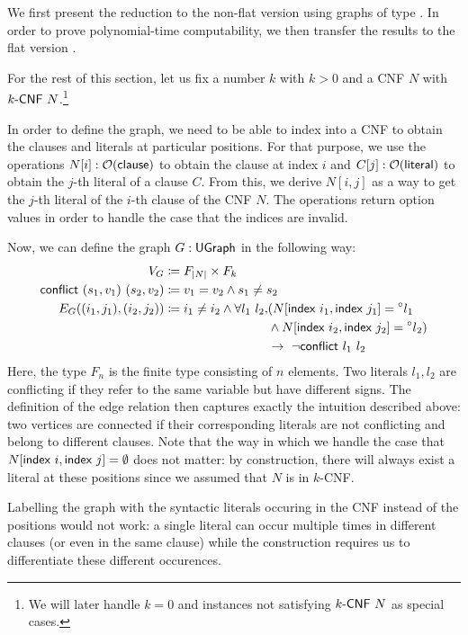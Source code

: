 We first present the reduction to the non-flat version \Clique{} using graphs of type \UGraph{}. In order to prove polynomial-time computability, we then transfer the results to the flat version \FlatClique{}. 

For the rest of this section, let us fix a number $k$ with $k > 0$ and a CNF $N$ with $\text{$k$-\textsf{CNF}}~N$.\footnote{We will later handle $k = 0$ and instances not satisfying $\text{$k$-\textsf{CNF}}~N$ as special cases.}

In order to define the graph, we need to be able to index into a CNF to obtain the clauses and literals at particular positions. 
For that purpose, we use the operations $N[i] : \mathcal{O}{(\textsf{clause})}$ to obtain the clause at index $i$ and $C[j] : \mathcal{O}{(\textsf{literal})}$ to obtain the $j$-th literal of a clause $C$. From this, we derive $N[i, j]$ as a way to get the $j$-th literal of the $i$-th clause of the CNF $N$. The operations return option values in order to handle the case that the indices are invalid. 

\newcommand{\literalsConflict}{\textsf{conflict}}
Now, we can define the graph $G : \textsf{UGraph}$ in the following way: 
\begin{align*} 
  V_G &\defeq F_{\length{N}} \times F_{k} \\
  \literalsConflict~(s_1, v_1)~(s_2, v_2) &\defeq v_1 = v_2 \land s_1 \neq s_2 \\
  E_G ((i_1, j_1), (i_2, j_2)) &\defeq i_1 \neq i_2 \land 
  \begin{aligned}[t]
    \forall l_1~l_2, &(N[\findex{i_1}, \findex{j_1}] = \OSome{l_1} \\
                     &\land N[\findex{i_2}, \findex{j_2}] = \OSome{l_2}) \\
                     &\rightarrow~\lnot \literalsConflict~l_1~l_2 
  \end{aligned}
\end{align*}
Here, the type $F_n$ is the finite type consisting of $n$ elements. Two literals $l_1, l_2$ are conflicting if they refer to the same variable but have different signs. 
The definition of the edge relation then captures exactly the intuition described above: two vertices are connected if their corresponding literals are not conflicting and belong to different clauses. 
Note that the way in which we handle the case that $N[\textsf{index}~i, \textsf{index}~j] = \emptyset$ does not matter: by construction, there will always exist a literal at these positions since we assumed that $N$ is in $k$-CNF.

\begin{remark}
  Labelling the graph with the syntactic literals occuring in the CNF instead of the positions would not work: a single literal can occur multiple times in different clauses (or even in the same clause) while the construction requires us to differentiate these different occurences. 
\end{remark}

